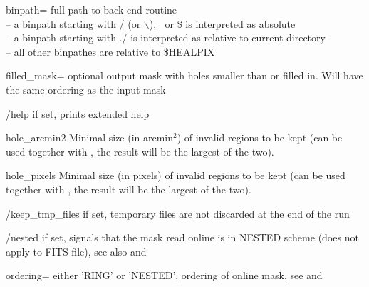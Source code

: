 \begin{keywords}
  \begin{kwlist}{} %
 \item[binpath=]  full path to back-end routine \\
              -- a binpath starting with / (or $\backslash$), $~$ or \$ is interpreted as absolute\\
              -- a binpath starting with ./ is interpreted as relative to current directory\\
              -- all other binpathes are relative to \$HEALPIX

 \item[filled\_mask=]  optional output
mask with holes smaller than 
 or 
 filled in.
     Will have the same ordering as the input mask

 \item[/help]       if set, prints extended help

 \item[hole\_arcmin2]    Minimal size
(in arcmin$^2$) of invalid regions to be kept 
    (can be used together with , 
     the result will be the largest of the two). 

 \item[hole\_pixels]    Minimal size (in pixels) of invalid regions to be kept 
    (can be used together with , 
     the result will be the largest of the two). 

\item[/keep\_tmp\_files]  if set,
temporary files are not discarded at the end of the run

\item[/nested]  if set, signals that the mask read online is in
   NESTED scheme (does not apply to FITS file), see also
 and 

\item[ordering=]  either 'RING' or 'NESTED', ordering of online mask,
 see 
 and 


\end{kwlist}
\end{keywords}
